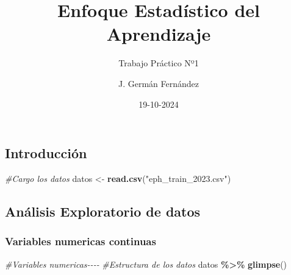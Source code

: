 \documentclass[
]{article}
\title{Enfoque Estadístico del Aprendizaje}
\subtitle{Trabajo Práctico Nº1}
\author{J. Germán Fernández}
\date{19-10-2024}
\newenvironment{Shaded}{\begin{snugshade}}{\end{snugshade}}
\newcommand{\CommentTok}[1]{\textcolor[rgb]{0.56,0.35,0.01}{\textit{#1}}}
\newcommand{\FunctionTok}[1]{\textcolor[rgb]{0.13,0.29,0.53}{\textbf{#1}}}
\newcommand{\NormalTok}[1]{#1}
\newcommand{\OtherTok}[1]{\textcolor[rgb]{0.56,0.35,0.01}{#1}}
\newcommand{\SpecialCharTok}[1]{\textcolor[rgb]{0.81,0.36,0.00}{\textbf{#1}}}
\newcommand{\StringTok}[1]{\textcolor[rgb]{0.31,0.60,0.02}{#1}}
\begin{document}
\maketitle

{
\setcounter{tocdepth}{2}
\tableofcontents
}
\subsection{Introducción}\label{introducciuxf3n}

\begin{Shaded}
\begin{Highlighting}[]
\CommentTok{\#Cargo los datos}
\NormalTok{datos }\OtherTok{\textless{}{-}} \FunctionTok{read.csv}\NormalTok{(}\StringTok{"eph\_train\_2023.csv"}\NormalTok{)}
\end{Highlighting}
\end{Shaded}

\subsection{Análisis Exploratorio de
datos}\label{anuxe1lisis-exploratorio-de-datos}

\subsubsection{Variables numericas
continuas}\label{variables-numericas-continuas}

\begin{Shaded}
\begin{Highlighting}[]
\CommentTok{\#Variables numericas{-}{-}{-}{-}}
\CommentTok{\#Estructura de los datos}
\NormalTok{datos }\SpecialCharTok{\%\textgreater{}\%} \FunctionTok{glimpse}\NormalTok{()}
\end{Highlighting}
\end{Shaded}
\end{document}
